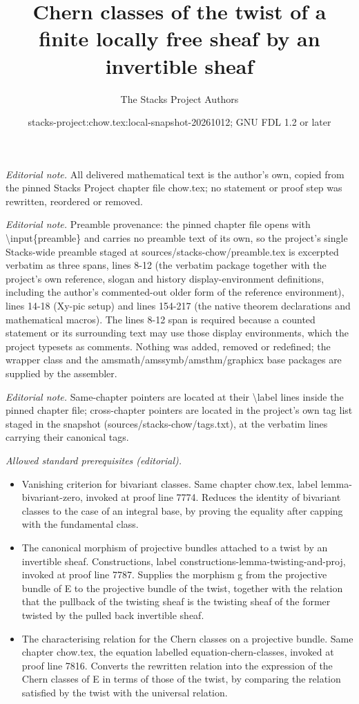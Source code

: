 \documentclass[10pt,a4paper]{amsart}
\title{Chern classes of the twist of a finite locally free sheaf by an invertible sheaf}
\author{The Stacks Project Authors}
\date{stacks-project:chow.tex:local-snapshot-20261012; GNU FDL 1.2 or later}
\theoremstyle{plain}
\theoremstyle{definition}
\theoremstyle{remark}
\numberwithin{equation}{subsection}
\begin{document}
\maketitle
\noindent\textit{Editorial note.} All delivered mathematical text is the author's own, copied from the pinned Stacks Project chapter file chow.tex; no statement or proof step was rewritten, reordered or removed.\par\medskip
\noindent\textit{Editorial note.} Preamble provenance: the pinned chapter file opens with \textbackslash{}input\{preamble\} and carries no preamble text of its own, so the project's single Stacks-wide preamble staged at sources/stacks-chow/preamble.tex is excerpted verbatim as three spans, lines 8-12 (the verbatim package together with the project's own reference, slogan and history display-environment definitions, including the author's commented-out older form of the reference environment), lines 14-18 (Xy-pic setup) and lines 154-217 (the native theorem declarations and mathematical macros). The lines 8-12 span is required because a counted statement or its surrounding text may use those display environments, which the project typesets as comments. Nothing was added, removed or redefined; the wrapper class and the amsmath/amssymb/amsthm/graphicx base packages are supplied by the assembler.\par\medskip
\noindent\textit{Editorial note.} Same-chapter pointers are located at their \textbackslash{}label lines inside the pinned chapter file; cross-chapter pointers are located in the project's own tag list staged in the snapshot (sources/stacks-chow/tags.txt), at the verbatim lines carrying their canonical tags.\par\medskip
\noindent\textit{Allowed standard prerequisites (editorial).}\begin{itemize}
\item Vanishing criterion for bivariant classes. Same chapter chow.tex, label lemma-bivariant-zero, invoked at proof line 7774. Reduces the identity of bivariant classes to the case of an integral base, by proving the equality after capping with the fundamental class.
\item The canonical morphism of projective bundles attached to a twist by an invertible sheaf. Constructions, label constructions-lemma-twisting-and-proj, invoked at proof line 7787. Supplies the morphism g from the projective bundle of E to the projective bundle of the twist, together with the relation that the pullback of the twisting sheaf is the twisting sheaf of the former twisted by the pulled back invertible sheaf.
\item The characterising relation for the Chern classes on a projective bundle. Same chapter chow.tex, the equation labelled equation-chern-classes, invoked at proof line 7816. Converts the rewritten relation into the expression of the Chern classes of E in terms of those of the twist, by comparing the relation satisfied by the twist with the universal relation.
\end{itemize}\medskip
\end{document}

